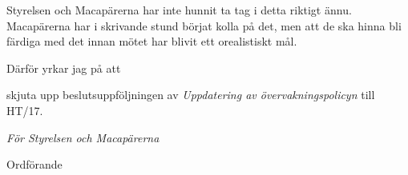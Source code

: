 \documentclass[../_main/handlingar.tex]{subfiles}
\begin{document}

Styrelsen och Macapärerna har inte hunnit ta tag i detta riktigt ännu. Macapärerna har i skrivande stund börjat kolla på det, men att de ska hinna bli färdiga med det innan mötet har blivit ett orealistiskt mål.

Därför yrkar jag på att

\begin{attsatser}
    \att skjuta upp beslutsuppföljningen av \emph{Uppdatering av övervakningspolicyn} till HT/17.
\end{attsatser}

\begin{signatures}{1}
    \emph{För Styrelsen och Macapärerna}
    \signature{Erik Månsson}{Ordförande}
\end{signatures}
\end{document}
